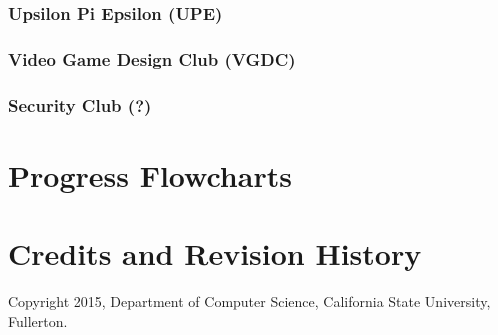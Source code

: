 \documentclass{book}
\begin{document}
\subsection{Upsilon Pi Epsilon (UPE)}
\subsection{Video Game Design Club (VGDC)}
\subsection{Security Club (?)}

\chapter{Progress Flowcharts}

\chapter{Credits and Revision History}

Copyright 2015, Department of Computer Science, California State University, Fullerton.

\cleardoublepage {} \printindex
\end{document}
